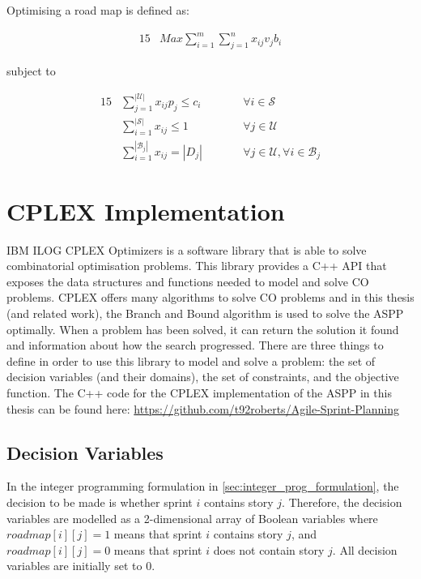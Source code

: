 Optimising a road map is defined as:

\begin{alignat}{15}    
    & Max \sum_{i=1}^{m} \sum_{j=1}^{n} x_{ij} v_j b_i \label{eq:objective}
\end{alignat}
\normalsize

subject to

\begin{alignat}{15}    
    & \sum_{j=1}^{|\mathcal{U}|} x_{ij} p_j \leq c_i                \quad \quad && \forall i \in \mathcal{S}    \label{eq:constr1}\\ %
    & \sum_{i=1}^{|\mathcal{S}|} x_{ij} \leq 1                      \quad \quad && \forall j \in \mathcal{U}    \label{eq:constr2}\\ %
    & \sum_{i=1}^{|\mathcal{B}_j|} x_{ij} = |D_j|   \quad \quad && \forall j \in \mathcal{U}, \forall i \in \mathcal{B}_j \label{eq:constr3} %
\end{alignat}
\normalsize

\section{CPLEX Implementation}
\label{sec:cplex_implementation}

IBM ILOG CPLEX Optimizers \citep{ibm_corporation_2018} is a software library that is able to solve combinatorial optimisation problems. This library provides a C++ API that exposes the data structures and functions needed to model and solve CO problems. CPLEX offers many algorithms to solve CO problems and in this thesis (and related work), the Branch and Bound algorithm is used to solve the ASPP optimally. When a problem has been solved, it can return the solution it found and information about how the search progressed. There are three things to define in order to use this library to model and solve a problem: the set of decision variables (and their domains), the set of constraints, and the objective function. The C++ code for the CPLEX implementation of the ASPP in this thesis can be found here: \url{https://github.com/t92roberts/Agile-Sprint-Planning}

\subsection{Decision Variables}
In the integer programming formulation in \cref{sec:integer_prog_formulation}, the decision to be made is whether sprint $i$ contains story $j$. Therefore, the decision variables are modelled as a 2-dimensional array of Boolean variables where $roadmap[i][j] = 1$ means that sprint $i$ contains story $j$, and $roadmap[i][j] = 0$ means that sprint $i$ does not contain story $j$. All decision variables are initially set to $0$.

